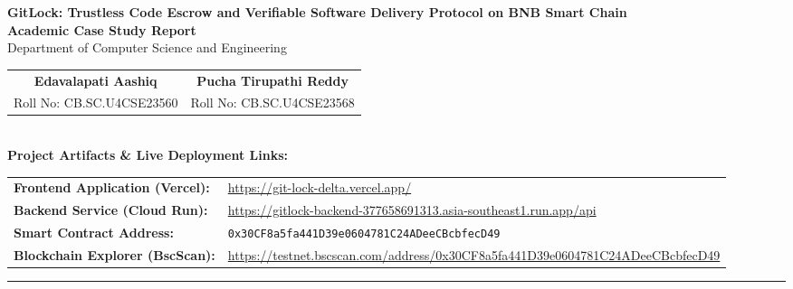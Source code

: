 \documentclass[11pt,a4paper]{article}
\begin{document}
\begin{center}
    {\LARGE \textbf{GitLock: Trustless Code Escrow and Verifiable Software Delivery Protocol on BNB Smart Chain}}\\[1.2em]
    
    {\large \textbf{Academic Case Study Report}}\\[0.4em]
    {\normalsize Department of Computer Science and Engineering}\\[1.2em]
    
    \begin{tabular}{cc}
        \textbf{Edavalapati Aashiq} & \textbf{Pucha Tirupathi Reddy} \\
        Roll No: CB.SC.U4CSE23560 & Roll No: CB.SC.U4CSE23568 \\
    \end{tabular}\\[1.5em]
    
    {\small \textbf{Project Artifacts \& Live Deployment Links:}}\\[0.5em]
\end{center}

\noindent
\begin{tabularx}{\textwidth}{@{} >{\bfseries}p{4.2cm} X @{}}
    Frontend Application (Vercel): & \url{https://git-lock-delta.vercel.app/} \\
    \addlinespace[2pt]
    Backend Service (Cloud Run): & \url{https://gitlock-backend-377658691313.asia-southeast1.run.app/api} \\
    \addlinespace[2pt]
    Smart Contract Address: & \texttt{0x30CF8a5fa441D39e0604781C24ADeeCBcbfecD49} \\
    \addlinespace[2pt]
    Blockchain Explorer (BscScan): & \url{https://testnet.bscscan.com/address/0x30CF8a5fa441D39e0604781C24ADeeCBcbfecD49} \\
\end{tabularx}

\vspace{0.8em}
\hrule
\vspace{1em}
\end{document}
